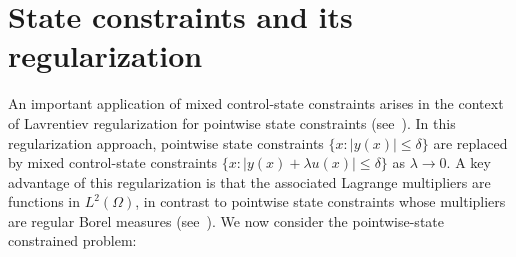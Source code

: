\documentclass[11pt,a4paper]{amsart}
\newcommand{\om}{\Omega}
\newcommand{\norm}[1]{\lVert #1 \rVert}
\begin{document}






\section{State constraints and its regularization}
An important application of mixed control-state constraints arises in the context of Lavrentiev regularization for pointwise state constraints (see~\cite{meyroetro06}). In this regularization approach, pointwise state constraints $\{x : |y(x)| \leq \delta \}$ are replaced by mixed control-state constraints $\{x : |y(x) + \lambda u(x)| \leq \delta \}$ as $\lambda \to 0$. A key advantage of this regularization is that the associated Lagrange multipliers are functions in $L^2(\Omega)$, in contrast to pointwise state constraints whose multipliers are regular Borel measures (see~\cite{cas86}).
We now consider the pointwise-state constrained problem:
\end{document}
